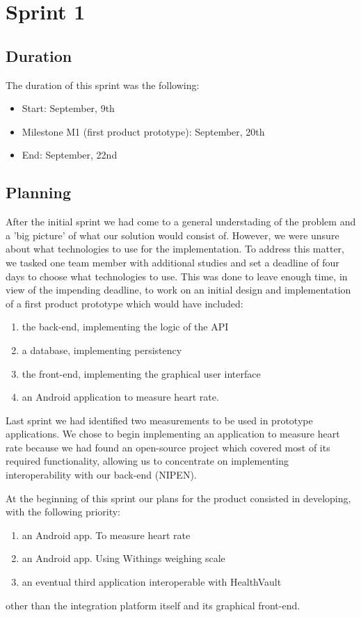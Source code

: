 	
\chapter{Sprint 1}
\label{Sprint1}

\section{Duration}
The duration of this sprint was the following:
\begin{itemize}
\item Start: September, 9th
\item Milestone M1 (first product prototype): September, 20th
\item End: September, 22nd
\end{itemize}

\section{Planning}

After the initial sprint we had come to a general understading of the problem and a 'big picture' of what our solution would consist of. 
However, we were unsure about what technologies to use for the implementation. 
To address this matter, we tasked one team member with additional studies and set a deadline of four days to choose what technologies to use.
This was done to leave enough time, in view of the impending deadline, to work on an initial design and implementation of a first product prototype which would have included:
\begin{enumerate}
\item the back-end, implementing the logic of the API
\item a database, implementing persistency
\item the front-end, implementing the graphical user interface
\item an Android application to measure heart rate.
\end{enumerate}

Last sprint we had identified two measurements to be used in prototype applications.
We chose to begin implementing an application to measure heart rate because we had found an open-source project which covered most of its required functionality, allowing us to concentrate on implementing interoperability with our back-end (NIPEN).

At the beginning of this sprint our plans for the product consisted in developing, with the following priority:
\begin{enumerate}[1.]
\item an Android app. To measure heart rate
\item an Android app. Using Withings weighing scale
\item an eventual third application interoperable with HealthVault
\end{enumerate}
other than the integration platform itself and its graphical front-end.


